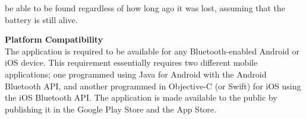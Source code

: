 \documentclass[12pt]{article}
\begin{document}
\begin{packed_enum}
\begin{packed_enum}
\begin{packed_enum}
        be able to be found regardless of how long ago it was lost, assuming that the battery is still alive.
      \end{packed_enum}
      \item \textbf{Platform Compatibility} \\
      The application is required to be available for any Bluetooth-enabled Android or iOS device. This
      requirement essentially requires two different mobile applications; one programmed using Java for Android
      with the Android Bluetooth API, and another programmed in Objective-C (or Swift) for iOS using the iOS
      Bluetooth API. The application is made available to the public by publishing it in the Google Play Store
      and the App Store.
    \end{packed_enum}
  \end{packed_enum}

  
\end{document}
